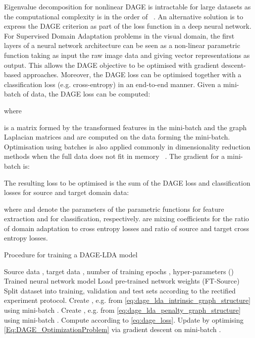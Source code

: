 \documentclass[journal]{IEEEtran}
\begin{document}
Eigenvalue decomposition for nonlinear DAGE is intractable for large datasets as the computational complexity is in the order of ~\cite{pan1999eigencomplexity}. An alternative solution is to express the DAGE criterion as part of the loss function in a deep neural network. For Supervised Domain Adaptation problems in the visual domain, the first layers of a neural network architecture can be seen as a non-linear parametric function  taking as input the raw image data and giving vector representations  as output. This allows the DAGE objective to be optimised with gradient descent-based approaches. Moreover, the DAGE loss can be optimised together with a classification loss (e.g. cross-entropy) in an end-to-end manner. Given a mini-batch  of data, the DAGE loss can be computed:

where 

is a matrix formed by the transformed features in the mini-batch  and the graph Laplacian matrices  and  are computed on the data forming the mini-batch. 
Optimisation using batches is also applied commonly in dimensionality reduction methods when the full data does not fit in memory ~\cite{maaten2019learning, passalis2018dimensionality, gheche2019stochastic}.
The gradient for a mini-batch is:




The resulting loss to be optimised is the sum of the DAGE loss and classification losses for source and target domain data:

where  and  denote the parameters of the parametric functions  for feature extraction and  for classification, respectively. 
 are mixing coefficients for the ratio of domain adaptation to cross entropy losses and ratio of source and target cross entropy losses.


\begin{algorithm}[H]
 \caption{Procedure for training a DAGE-LDA model}
 \label{alg:train-dage-lda-model}
  \begin{algorithmic}[1]
 \REQUIRE Source data , target data , number of training epochs , hyper-parameters ()
  \ENSURE  Trained neural network model 
  \STATE  Load pre-trained network weights (FT-Source)
  \STATE Split dataset into training, validation and test sets according to the rectified experiment protocol.
  \STATE 
  \STATE Create , e.g. from \cref{eq:dage_lda_intrinsic_graph_structure}  using mini-batch .
  \STATE Create , e.g. from \cref{eq:dage_lda_penalty_graph_structure} using mini-batch  .
  \STATE Compute  according to \cref{eq:dage_loss}.
   \STATE Update  by optimising \cref{Eq:DAGE_OptimizationProblem} via gradient descent on mini-batch .
  \ENDFOR
  \ENDFOR
 \end{algorithmic}
 \end{algorithm}
\end{document}
